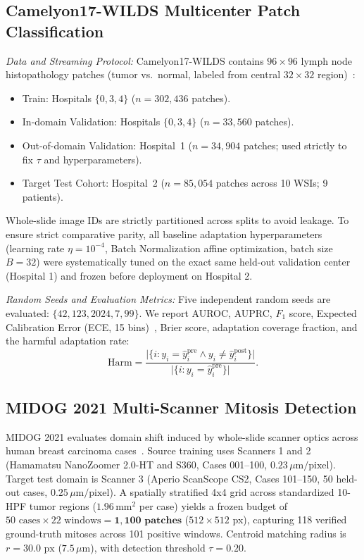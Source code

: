 \documentclass[journal]{IEEEtran}
\begin{document}
\subsection{Camelyon17-WILDS Multicenter Patch Classification}
\textit{Data and Streaming Protocol:} Camelyon17-WILDS contains $96 \times 96$ lymph node histopathology patches (tumor vs.\ normal, labeled from central $32 \times 32$ region)~\cite{koh2021wilds,bandi2018camelyon17}:
\begin{itemize}\setlength{\itemsep}{1pt}\setlength{\parskip}{0pt}
\item Train: Hospitals $\{0, 3, 4\}$ ($n=302{,}436$ patches).
\item In-domain Validation: Hospitals $\{0, 3, 4\}$ ($n=33{,}560$ patches).
\item Out-of-domain Validation: Hospital~1 ($n=34{,}904$ patches; used strictly to fix $\tau$ and hyperparameters).
\item Target Test Cohort: Hospital~2 ($n=85{,}054$ patches across 10 WSIs; 9 patients).
\end{itemize}
Whole-slide image IDs are strictly partitioned across splits to avoid leakage. To ensure strict comparative parity, all baseline adaptation hyperparameters (learning rate $\eta = 10^{-4}$, Batch Normalization affine optimization, batch size $B=32$) were systematically tuned on the exact same held-out validation center (Hospital 1) and frozen before deployment on Hospital 2.

\textit{Random Seeds and Evaluation Metrics:} Five independent random seeds are evaluated: $\{42, 123, 2024, 7, 99\}$. We report AUROC, AUPRC, $F_1$ score, Expected Calibration Error (ECE, 15 bins)~\cite{guo2017calibration}, Brier score, adaptation coverage fraction, and the harmful adaptation rate:
\begin{equation}
\label{eq:harm_rate}
\mathrm{Harm} = \frac{\bigl|\{i : y_i = \hat{y}_i^{\mathrm{pre}} \land y_i \ne \hat{y}_i^{\mathrm{post}}\}\bigr|}{\bigl|\{i : y_i = \hat{y}_i^{\mathrm{pre}}\}\bigr|}.
\end{equation}

\subsection{MIDOG 2021 Multi-Scanner Mitosis Detection}
MIDOG 2021 evaluates domain shift induced by whole-slide scanner optics across human breast carcinoma cases~\cite{aubreville2023mitosis}.
Source training uses Scanners 1 and 2 (Hamamatsu NanoZoomer 2.0-HT and S360, Cases 001--100, $0.23\,\mu\text{m/pixel}$). Target test domain is Scanner 3 (Aperio ScanScope CS2, Cases 101--150, 50 held-out cases, $0.25\,\mu\text{m/pixel}$).
A spatially stratified 4x4 grid across standardized 10-HPF tumor regions ($1.96\,\mathrm{mm}^2$ per case) yields a frozen budget of $50 \text{ cases} \times 22 \text{ windows} = \mathbf{1{,}100\text{ patches}}$ ($512 \times 512$ px), capturing 118 verified ground-truth mitoses across 101 positive windows. Centroid matching radius is $r=30.0\text{ px}$ ($7.5\,\mu\text{m}$), with detection threshold $\tau=0.20$.
\end{document}
